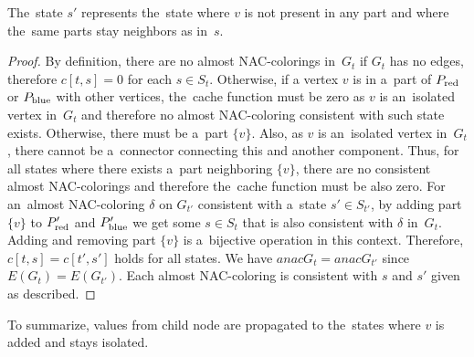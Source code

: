 \newpage
{}
%
The~state \( s' \) represents the~state where \( v \) is not present in any part
and where the~same parts stay neighbors as in~\( s \).
%
\begin{proof}
	By definition, there are no almost NAC-colorings
	in~\( G_t \) if \( G_t \) has no edges,
	therefore \( c[t, s] = 0 \) for each \( s \in S_t \).
	Otherwise, if a vertex \( v \) is in a~part of \( P_{\text{red}} \) or \( P_{\text{blue}} \) with other vertices,
	the~cache function must be zero as \( v \) is an~isolated vertex in~\( G_t \)
	and therefore no almost NAC-coloring consistent with such state exists.
	Otherwise, there must be a~part \( \{v\} \).
	Also, as \( v \) is an~isolated vertex in~\( G_t \), there cannot be a~connector
	connecting this and another component.
	Thus, for all states where there exists
	a~part neighboring \( \{v\} \), there are no consistent almost NAC-colorings
	and therefore the~cache function must be also zero.
	For an~almost NAC-coloring \( \delta \) on \( G_{t'} \) consistent with
	a~state \( s' \in S_{t'} \),
	by adding part \( \{v\} \) to \( P_{\text{red}}' \) and \( P_{\text{blue}}' \)
	we get some \( s \in S_t \) that is also consistent with \( \delta \) in~\( G_t \).
	Adding and removing part \( \{v\} \) is a~bijective operation in this context.
	Therefore, \( c[t, s] = c[t', s'] \) holds for all states.
	We have \( anac{G_t} = anac{G_{t'}} \) since \( E(G_t) = E(G_{t'}) \).
	Each almost NAC-coloring is consistent
	with \( s \) and \( s' \) given as described.
\end{proof}
%
To summarize, values from child node are propagated to the~states
where \( v \) is added and stays isolated.

